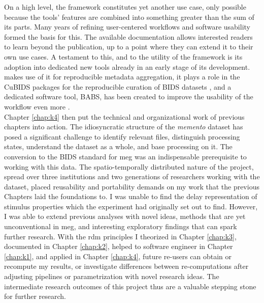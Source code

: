 On a high level, the framework constitutes yet another use case, only possible because the tools' features are combined into something greater than the sum of its parts.
Many years of refining user-centered workflows and software usability formed the basis for this.
The available documentation allows interested readers to learn beyond the publication, up to a point where they can extend it to their own use cases.
A testament to this, and to the utility of the framework is its adoption into dedicated new tools already in an early stage of its development.
\citet{heunis2023catalog} makes use of it for reproducible metadata aggregation, it plays a role in the CuBIDS packages for the reproducible curation of \gls{BIDS} datasets \citep{covitz2022curation}, and a dedicated software tool, BABS, has been created to improve the usability of the workflow even more \citep{zhao2023reproducible}.\\
Chapter \ref{chap:k4} then put the technical and organizational work of previous chapters into action.
The idiosyncratic structure of the \textit{memento} dataset has posed a significant challenge to identify relevant files, distinguish processing states, understand the dataset as a whole, and base processing on it.
The conversion to the \gls{BIDS} standard for \gls{meg} was an indispensable prerequisite to working with this data.
The spatio-temporally distributed nature of the project, spread over three institutions and two generations of researchers working with the dataset, placed reusability and portability demands on my work that the previous Chapters laid the foundations to.
I was unable to find the delay representation of stimulus properties which the experiment had originally set out to find.
However, I was able to extend previous analyses with novel ideas, methods that are yet unconventional in \gls{meg}, and interesting exploratory findings that can spark further research.
With the \gls{rdm} principles I theorized in Chapter \ref{chap:k3}, documented in Chapter \ref{chap:k2}, helped to software engineer in Chapter \ref{chap:k1}, and applied in Chapter \ref{chap:k4}, future re-users can obtain or recompute my results, or investigate differences between re-computations after adjusting pipelines or parametrization with novel research ideas.
The intermediate research outcomes of this project thus are a valuable stepping stone for further research.











